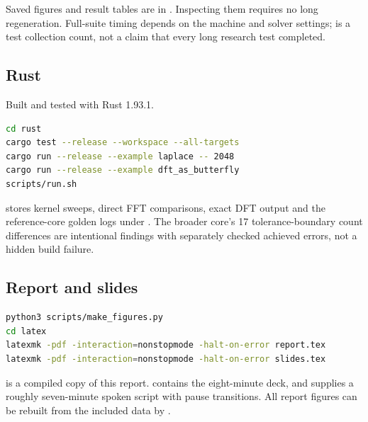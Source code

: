 Saved figures and result tables are in . Inspecting them requires no long regeneration. Full-suite timing depends on the machine and solver settings;  is a test collection count, not a claim that every long research test completed.

\subsection*{Rust}
Built and tested with Rust 1.93.1.
\begin{lstlisting}[language=bash]
cd rust
cargo test --release --workspace --all-targets
cargo run --release --example laplace -- 2048
cargo run --release --example dft_as_butterfly
scripts/run.sh
\end{lstlisting}
 stores kernel sweeps, direct FFT comparisons, exact DFT output and the reference-core golden logs under . The broader core's 17 tolerance-boundary count differences are intentional findings with separately checked achieved errors, not a hidden build failure.

\subsection*{Report and slides}
\begin{lstlisting}[language=bash]
python3 scripts/make_figures.py
cd latex
latexmk -pdf -interaction=nonstopmode -halt-on-error report.tex
latexmk -pdf -interaction=nonstopmode -halt-on-error slides.tex
\end{lstlisting}
 is a compiled copy of this report.  contains the eight-minute deck, and  supplies a roughly seven-minute spoken script with pause transitions. All report figures can be rebuilt from the included data by .
